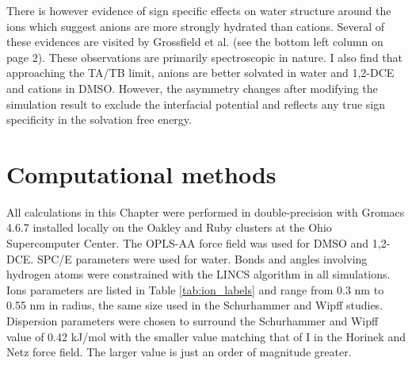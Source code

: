 \begin{tatb}
   There is however evidence of sign specific effects on water structure around the ions which suggest anions are more strongly hydrated than cations. Several of these
   evidences are visited by Grossfield et al. (see the bottom left column on page 2)\cite{ren2003amoebaion}. These observations are primarily 
   spectroscopic in nature. I also find that approaching the TA\sur{+}/TB\sur{-} limit, anions are better solvated in water and 1,2-DCE and cations in DMSO. However, 
   the asymmetry changes after modifying the simulation result to exclude the interfacial potential and reflects any true sign specificity in the solvation free energy.
   
  \section{\label{ch6:sec1:level1}Computational methods~}
   All calculations in this Chapter were performed in double-precision with Gromacs 4.6.7\cite{gromacs} installed locally on the Oakley and Ruby clusters at the Ohio 
   Supercomputer Center\cite{osc}. The OPLS-AA\cite{opls} force field was used for DMSO and 1,2-DCE. SPC/E\cite{spce} parameters were used for water. Bonds and angles 
   involving hydrogen atoms were constrained with the LINCS algorithm\cite{lincs} in all simulations. Ions parameters are listed in Table \ref{tab:ion_labels} and range
   from 0.3 nm to 0.55 nm in radius, the same size used in the Schurhammer and Wipff studies\cite{wipff1999tatb, wipff2000tatb, wipff2001tatb}. Dispersion
   parameters were chosen to surround the Schurhammer and Wipff value of 0.42 kJ/mol with the smaller value matching that of I\sur{-} in the Horinek and Netz force 
   field\cite{netz2009}. The larger value is just an order of magnitude greater.


\end{tatb}
